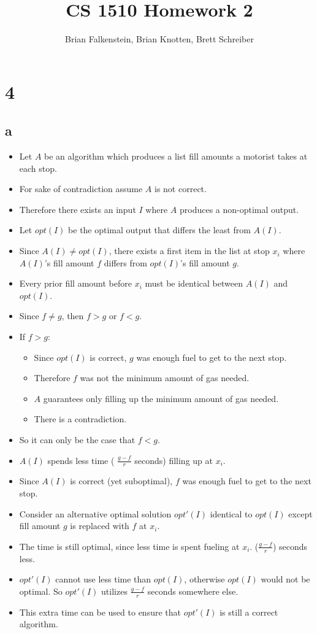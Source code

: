 \documentclass[letterpaper,notitlepage,twoside]{article}
\title{CS 1510 Homework 2}
\author{Brian Falkenstein, Brian Knotten, Brett Schreiber}
\begin{document}
\maketitle

\section*{4}
\subsection*{a}
\begin{itemize}
	\item Let $A$ be an algorithm which produces a list fill amounts a motorist takes at each stop. 
	\item For sake of contradiction assume $A$ is not correct.
	\item Therefore there exists an input $I$ where $A$ produces a non-optimal output.
	\item Let $opt(I)$ be the optimal output that differs the least from $A(I)$.
	\item Since $A(I) \neq opt(I)$, there exists a first item in the list at stop $x_i$ where $A(I)$'s fill amount $f$ differs from $opt(I)$'s fill amount $g$.
	\item Every prior fill amount before $x_i$ must be identical between $A(I)$ and $opt(I)$.
	\item Since $f \neq g$, then $f > g$ or $f < g$.
	\item If $f > g$:
	\begin{itemize}
		\item Since $opt(I)$ is correct, $g$ was enough fuel to get to the next stop.
		\item Therefore $f$ was not the minimum amount of gas needed.
		\item $A$ guarantees only filling up the minimum amount of gas needed.
		\item There is a contradiction.
	\end{itemize}
	
	\item So it can only be the case that $f < g$.
	\item $A(I)$ spends less time ( $\frac{g - f}{r}$ seconds) filling up at $x_i$.
	\item Since $A(I)$ is correct (yet suboptimal), $f$ was enough fuel to get to the next stop.
	\item Consider an alternative optimal solution $opt'(I)$ identical to $opt(I)$ except fill amount $g$ is replaced with $f$ at $x_i$.
	\item The time is still optimal, since less time is spent fueling at $x_i$. ($\frac{g - f}{r}$) seconds less.
	\item $opt'(I)$ cannot use less time than $opt(I)$, otherwise $opt(I)$ would not be optimal. So $opt'(I)$ utilizes $\frac{g - f}{r}$ seconds somewhere else.
	\item This extra time can be used to ensure that $opt'(I)$ is still a correct algorithm.
\end{itemize}
\end{document}

